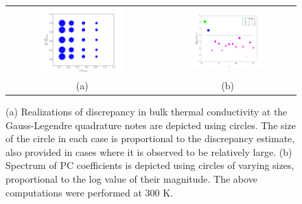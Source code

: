 \begin{figure}[htbp]
\begin{center}
\begin{tabular}{cc}
  \hspace{-12mm}
  \includegraphics[width=0.60\textwidth]{./Figures/realz_quad300K}
  &
  \hspace{-9mm}
  \includegraphics[width=0.56\textwidth]{./Figures/PCspectrum_300}
  \\ (a) & (b)
  \end{tabular}
\caption{(a) Realizations of discrepancy in bulk thermal conductivity at the Gauss-Legendre quadrature notes are
depicted using circles. The size of the circle in each case is proportional to the discrepancy estimate, also provided
 in cases where it is observed to be relatively large. (b) Spectrum of PC coefficients is depicted using circles of
 varying sizes, proportional to the log value of their magnitude. The above computations were performed at 300 K.}
\label{fig:rs1}
\end{center}
\end{figure}

